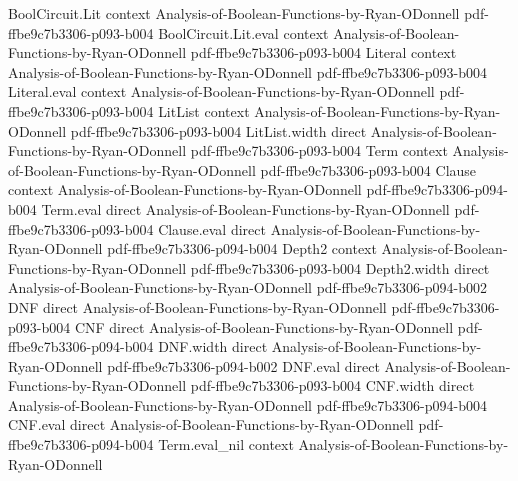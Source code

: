\begin{lemma}
\leanok
{}
\proofstep
  {BoolCircuit.Lit}
  {context}
  {Analysis-of-Boolean-Functions-by-Ryan-ODonnell}
  {pdf-ffbe9c7b3306-p093-b004}
\proofstep
  {BoolCircuit.Lit.eval}
  {context}
  {Analysis-of-Boolean-Functions-by-Ryan-ODonnell}
  {pdf-ffbe9c7b3306-p093-b004}
\proofstep
  {Literal}
  {context}
  {Analysis-of-Boolean-Functions-by-Ryan-ODonnell}
  {pdf-ffbe9c7b3306-p093-b004}
\proofstep
  {Literal.eval}
  {context}
  {Analysis-of-Boolean-Functions-by-Ryan-ODonnell}
  {pdf-ffbe9c7b3306-p093-b004}
\proofstep
  {LitList}
  {context}
  {Analysis-of-Boolean-Functions-by-Ryan-ODonnell}
  {pdf-ffbe9c7b3306-p093-b004}
\proofstep
  {LitList.width}
  {direct}
  {Analysis-of-Boolean-Functions-by-Ryan-ODonnell}
  {pdf-ffbe9c7b3306-p093-b004}
\proofstep
  {Term}
  {context}
  {Analysis-of-Boolean-Functions-by-Ryan-ODonnell}
  {pdf-ffbe9c7b3306-p093-b004}
\proofstep
  {Clause}
  {context}
  {Analysis-of-Boolean-Functions-by-Ryan-ODonnell}
  {pdf-ffbe9c7b3306-p094-b004}
\proofstep
  {Term.eval}
  {direct}
  {Analysis-of-Boolean-Functions-by-Ryan-ODonnell}
  {pdf-ffbe9c7b3306-p093-b004}
\proofstep
  {Clause.eval}
  {direct}
  {Analysis-of-Boolean-Functions-by-Ryan-ODonnell}
  {pdf-ffbe9c7b3306-p094-b004}
\proofstep
  {Depth2}
  {context}
  {Analysis-of-Boolean-Functions-by-Ryan-ODonnell}
  {pdf-ffbe9c7b3306-p093-b004}
\proofstep
  {Depth2.width}
  {direct}
  {Analysis-of-Boolean-Functions-by-Ryan-ODonnell}
  {pdf-ffbe9c7b3306-p094-b002}
\proofstep
  {DNF}
  {direct}
  {Analysis-of-Boolean-Functions-by-Ryan-ODonnell}
  {pdf-ffbe9c7b3306-p093-b004}
\proofstep
  {CNF}
  {direct}
  {Analysis-of-Boolean-Functions-by-Ryan-ODonnell}
  {pdf-ffbe9c7b3306-p094-b004}
\proofstep
  {DNF.width}
  {direct}
  {Analysis-of-Boolean-Functions-by-Ryan-ODonnell}
  {pdf-ffbe9c7b3306-p094-b002}
\proofstep
  {DNF.eval}
  {direct}
  {Analysis-of-Boolean-Functions-by-Ryan-ODonnell}
  {pdf-ffbe9c7b3306-p093-b004}
\proofstep
  {CNF.width}
  {direct}
  {Analysis-of-Boolean-Functions-by-Ryan-ODonnell}
  {pdf-ffbe9c7b3306-p094-b004}
\proofstep
  {CNF.eval}
  {direct}
  {Analysis-of-Boolean-Functions-by-Ryan-ODonnell}
  {pdf-ffbe9c7b3306-p094-b004}
\proofstep
  {Term.eval_nil}
  {context}
  {Analysis-of-Boolean-Functions-by-Ryan-ODonnell}

\end{lemma}
